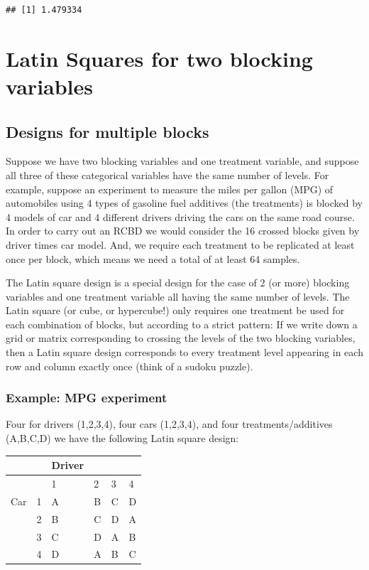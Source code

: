 \documentclass[
]{book}
\begin{document}
\begin{verbatim}
## [1] 1.479334
\end{verbatim}

\hypertarget{latin-squares-for-two-blocking-variables}{%
\chapter{Latin Squares for two blocking variables}\label{latin-squares-for-two-blocking-variables}}

\hypertarget{designs-for-multiple-blocks}{%
\section{Designs for multiple blocks}\label{designs-for-multiple-blocks}}

Suppose we have two blocking variables and one treatment variable, and suppose all three of these categorical variables have the same number of levels. For example, suppose an experiment to measure the miles per gallon (MPG) of automobiles using 4 types of gasoline fuel additives (the treatments) is blocked by 4 models of car and 4 different drivers driving the cars on the same road course. In order to carry out an RCBD we would consider the 16 crossed blocks given by driver times car model. And, we require each treatment to be replicated at least once per block, which means we need a total of at least 64 samples.

The Latin square design is a special design for the case of 2 (or more) blocking variables and one treatment variable all having the same number of levels. The Latin square (or cube, or hypercube!) only requires one treatment be used for each combination of blocks, but according to a strict pattern: If we write down a grid or matrix corresponding to crossing the levels of the two blocking variables, then a Latin square design corresponds to every treatment level appearing in each row and column exactly once (think of a sudoku puzzle).

\hypertarget{example-mpg-experiment}{%
\subsection{Example: MPG experiment}\label{example-mpg-experiment}}

Four for drivers (1,2,3,4), four cars (1,2,3,4), and four treatments/additives (A,B,C,D) we have the following Latin square design:

\begin{longtable}[]{@{}llllll@{}}
\toprule()
& & Driver & & & \\
\midrule()
\endhead
& & 1 & 2 & 3 & 4 \\
Car & 1 & A & B & C & D \\
& 2 & B & C & D & A \\
& 3 & C & D & A & B \\
& 4 & D & A & B & C \\
\bottomrule()
\end{longtable}
\end{document}
